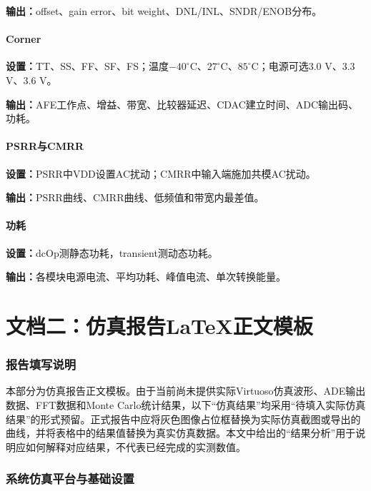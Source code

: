 \documentclass[12pt,a4paper]{ctexart}
\begin{document}
\textbf{输出：}offset、gain error、bit weight、DNL/INL、SNDR/ENOB分布。

\subsection{Corner}

\textbf{设置：}TT、SS、FF、SF、FS；温度$-40^{\circ}\mathrm{C}$、$27^{\circ}\mathrm{C}$、$85^{\circ}\mathrm{C}$；电源可选3.0 V、3.3 V、3.6 V。

\textbf{输出：}AFE工作点、增益、带宽、比较器延迟、CDAC建立时间、ADC输出码、功耗。

\subsection{PSRR与CMRR}

\textbf{设置：}PSRR中VDD设置AC扰动；CMRR中输入端施加共模AC扰动。

\textbf{输出：}PSRR曲线、CMRR曲线、低频值和带宽内最差值。

\subsection{功耗}

\textbf{设置：}dcOp测静态功耗，transient测动态功耗。

\textbf{输出：}各模块电源电流、平均功耗、峰值电流、单次转换能量。

\newpage

\part{文档二：仿真报告LaTeX正文模板}

\section{报告填写说明}

本部分为仿真报告正文模板。由于当前尚未提供实际Virtuoso仿真波形、ADE输出数据、FFT数据和Monte Carlo统计结果，以下“仿真结果”均采用“待填入实际仿真结果”的形式预留。正式报告中应将灰色图像占位框替换为实际仿真截图或导出的曲线，并将表格中的结果值替换为真实仿真数据。本文中给出的“结果分析”用于说明应如何解释对应结果，不代表已经完成的实测数值。

\section{系统仿真平台与基础设置}
\end{document}

